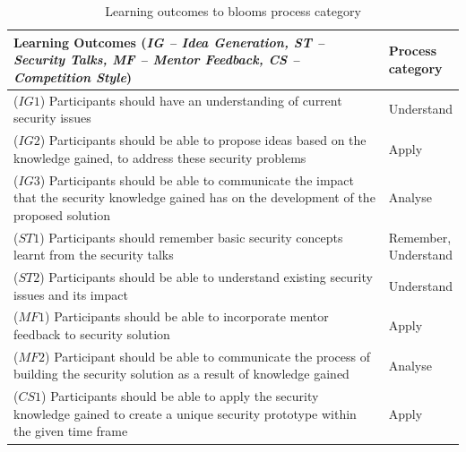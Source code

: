 \documentclass[runningheads]{llncs}
\begin{document}
 \begin{table}[h]
    \centering
    \caption{Learning outcomes to blooms process category}
    \label{tab:learningoutcomesbloom}
    \begin{tabular}{|p{0.86\linewidth}|p{0.14\linewidth}|} \hline
    Learning Outcomes (\textit{IG -- Idea Generation, ST -- Security Talks, MF -- Mentor Feedback, CS -- Competition Style}) & Process \newline category\\ \hline
    ($IG1$) Participants should have an understanding of current security issues & Understand \\ \hline
    ($IG2$) Participants should be able to propose ideas based on the knowledge gained, to address these security problems & Apply\\ \hline
    ($IG3$) Participants should be able to communicate the impact that the security knowledge gained has on the development of the proposed solution & Analyse \\ \hline
    ($ST1$) Participants should remember basic security concepts learnt from the security talks & Remember, \newline Understand \\ \hline
    ($ST2$) Participants should be able to understand existing security issues and its impact & Understand \\ \hline
    ($MF1$) Participants should be able to incorporate mentor feedback to security solution & Apply \\ \hline
    ($MF2$) Participant should be able to communicate the process of building the security solution as a result of knowledge gained & Analyse \\ \hline
    ($CS1$) Participants should be able to apply the security knowledge gained to create a unique security prototype within the given time frame & Apply \\ \hline
    \end{tabular}
    \vspace{-10pt}
\end{table}
\end{document}
